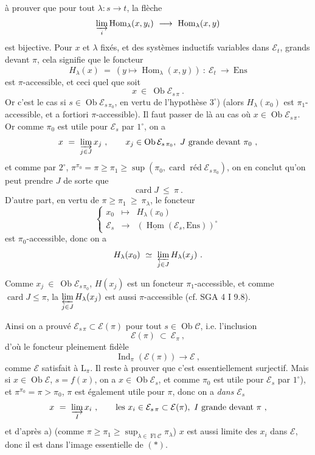 \documentclass[11pt]{article}
\newcommand{\printedpage}[1]{\marginpar{\footnotesize p.~#1}}
\newcommand{\msp}[1]{\marginpar{\footnotesize [#1]}}
\newcommand{\cE}{\mathcal{E}}
\newcommand{\cC}{\mathcal{C}}
\newcommand{\Ob}{\operatorname{Ob}}
\newcommand{\Fl}{\operatorname{Fl}}
\newcommand{\Hom}{\operatorname{Hom}}
\newcommand{\Ind}{\operatorname{Ind}}
\newcommand{\card}{\operatorname{card}}
\newcommand{\red}{\operatorname{\text{réd}}}
\newcommand{\Ens}{\mathrm{Ens}}
\begin{document}
\printedpage{164}

\msp{page 430}à prouver que pour tout $\lambda : s \longrightarrow t$, la flèche
\[
\varinjlim_{i} \Hom_{\lambda}(x, y_i) \ \longrightarrow \ \Hom_{\lambda}(x, y)
\]
est bijective. Pour $x$ et $\lambda$ fixés, et des systèmes inductifs variables dans $\cE_t$, grands devant $\pi$, cela signifie que le foncteur
\[
H_{\lambda}(x) \ = \ (y \longmapsto \Hom_{\lambda}(x, y)) \ : \ \cE_t \ \longrightarrow \ \Ens
\]
est $\pi$-accessible, et ceci quel que soit
\[
x \ \in \ \Ob \cE_{s\,\pi} \ .
\]
Or c'est le cas si $s \in \Ob \cE_{s\,\pi_0}$, en vertu de l'hypothèse $3^{\circ}$) (alors $H_{\lambda}(x_0)$ est $\pi_1$-accessible, %
et a fortiori $\pi$-accessible). Il faut passer de là au cas où $x \in \Ob \cE_{s\,\pi}$. Or comme $\pi_0$ est utile pour $\cE_s$ par $1^{\circ}$, on a
\[
x \ = \ \varinjlim_{j \in J} x_j \ , \qquad x_j \in \Ob \cE_{s\,\pi_0},\ J \text{ grande devant } \pi_0 \ ,
\]
et comme par $2^{\circ}$, $\pi^{\pi_0} = \pi \geqslant \pi_1 \geqslant \sup(\pi_0, \card \red \cE_{s\,\pi_0})$, on en conclut qu'on peut prendre $J$ de sorte que
\[
\card J \ \leqslant \ \pi \ .
\]
D'autre part, en vertu de $\pi \geqslant \pi_1 \ \geqslant \ \pi_{\lambda}$, le foncteur
\[
\left\{
\begin{array}{lcl}
x_0 & \longmapsto & H_{\lambda}(x_0) \\[1ex]
\cE_s & \longrightarrow & (\underline{\Hom}(\cE_s, \Ens))^{\circ}
\end{array}
\right.
\]
est $\pi_0$-accessible, donc on a
\[
H_{\lambda}(x_0) \ \simeq \ \varprojlim_{j \in J} H_{\lambda}(x_j) \ .
\]

\msp{page 431}Comme $x_j \ \in \ \Ob \cE_{s\,\pi_0}$, $H(x_j)$ est un foncteur $\pi_1$-accessible, et comme $\card J \leqslant \pi$, la $\varprojlim\limits_{j \in J} H_{\lambda}(x_j)$ est aussi $\pi$-accessible (cf. SGA 4 I 9.8).

Ainsi on a prouvé $\cE_{s\,\pi} \subset \cE(\pi)$ pour tout $s \in \Ob \cC$, i.e. l'inclusion
\[
\cE(\pi) \ \subset \ \cE_{\pi} \ ,
\]
d'où le foncteur pleinement fidèle
\[
\Ind_{\pi}(\cE(\pi)) \longrightarrow \cE \ , \tag*{$(*)$}
\]
comme $\cE$ satisfait à $\mathrm{L}_{\pi}$. Il reste à prouver que c'est essentiellement surjectif. Mais si $x \in \Ob \cE$, $s = f(x)$, on a $x \in \Ob \cE_s$, et comme $\pi_0$ est utile pour $\cE_s$ par $1^{\circ}$), et $\pi^{\pi_0} = \pi > \pi_0$,
$\pi$ est également utile pour $\pi$, donc on a \textit{dans} $\cE_s$ %
\[
x \ = \ \varinjlim_{I} x_i \ , \qquad \text{les } x_i \in \cE_{s\,\pi} \subset \cE(\pi),\ I \text{ grande devant } \pi \ ,
\]
\printedpage{165}
et d'après a) (comme $\pi \geqslant \pi_1 \geqslant \sup_{\lambda \in \Fl \cC} \pi_{\lambda}$) $x$ est aussi limite des $x_i$ dans $\cE$, donc il est dans l'image essentielle de $(*)$.
\end{document}
